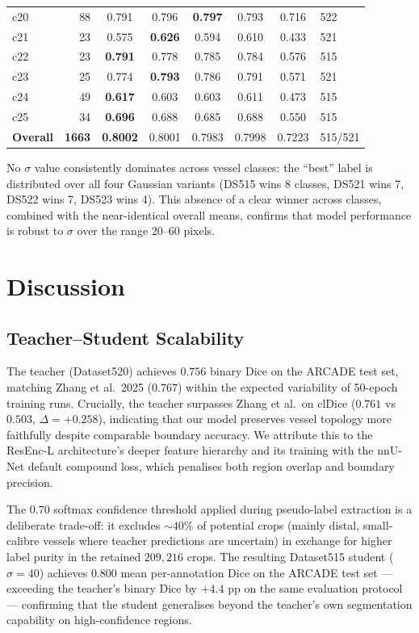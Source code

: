 \documentclass[12pt]{article}
\begin{document}
\begin{table}[!htb]
\begin{tabular}{lrcccccl}
c20 &  88 & 0.791 & 0.796 & \textbf{0.797} & 0.793 & 0.716 & 522 \\
c21 &  23 & 0.575 & \textbf{0.626} & 0.594 & 0.610 & 0.433 & 521 \\
c22 &  23 & \textbf{0.791} & 0.778 & 0.785 & 0.784 & 0.576 & 515 \\
c23 &  25 & 0.774 & \textbf{0.793} & 0.786 & 0.791 & 0.571 & 521 \\
c24 &  49 & \textbf{0.617} & 0.603 & 0.603 & 0.611 & 0.473 & 515 \\
c25 &  34 & \textbf{0.696} & 0.688 & 0.685 & 0.688 & 0.550 & 515 \\
\midrule
\textbf{Overall} & \textbf{1663} & \textbf{0.8002} & 0.8001 & 0.7983 & 0.7998 & 0.7223 & 515/521 \\
\bottomrule
\end{tabular}
\end{table}

No $\sigma$ value consistently dominates across vessel classes: the ``best''
label is distributed over all four Gaussian variants (DS515 wins 8 classes,
DS521 wins 7, DS522 wins 7, DS523 wins 4). This absence of a clear winner
across classes, combined with the near-identical overall means, confirms that
model performance is robust to $\sigma$ over the range $20$--$60$ pixels.

\section{Discussion}

\subsection{Teacher–Student Scalability}

The teacher (Dataset520) achieves $0.756$ binary Dice on the ARCADE test set,
matching Zhang et al.\ 2025 ($0.767$) within the expected variability of
50-epoch training runs. Crucially, the teacher surpasses Zhang et al.\ on
clDice ($0.761$ vs $0.503$, $\Delta{=}{+}0.258$), indicating that our model
preserves vessel topology more faithfully despite comparable boundary accuracy.
We attribute this to the ResEnc-L architecture's deeper feature hierarchy and
its training with the nnU-Net default compound loss, which penalises both
region overlap and boundary precision.

The $0.70$ softmax confidence threshold applied during pseudo-label extraction
is a deliberate trade-off: it excludes ${\sim}40\%$ of potential crops (mainly
distal, small-calibre vessels where teacher predictions are uncertain) in
exchange for higher label purity in the retained $209{,}216$ crops. The
resulting Dataset515 student ($\sigma{=}40$) achieves $0.800$ mean per-annotation
Dice on the ARCADE test set — exceeding the teacher's binary Dice by $+4.4$ pp
on the same evaluation protocol — confirming that the student generalises
beyond the teacher's own segmentation capability on high-confidence regions.
\end{document}
